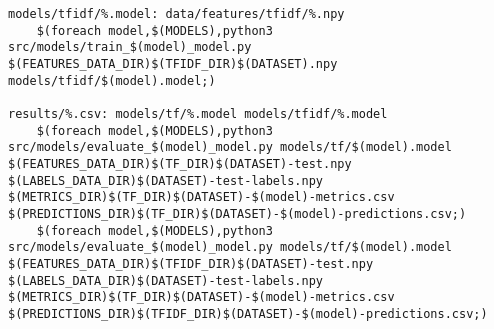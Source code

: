 \begin{lstlisting}
models/tfidf/%.model: data/features/tfidf/%.npy
	$(foreach model,$(MODELS),python3 src/models/train_$(model)_model.py $(FEATURES_DATA_DIR)$(TFIDF_DIR)$(DATASET).npy models/tfidf/$(model).model;)

results/%.csv: models/tf/%.model models/tfidf/%.model
	$(foreach model,$(MODELS),python3 src/models/evaluate_$(model)_model.py models/tf/$(model).model $(FEATURES_DATA_DIR)$(TF_DIR)$(DATASET)-test.npy $(LABELS_DATA_DIR)$(DATASET)-test-labels.npy $(METRICS_DIR)$(TF_DIR)$(DATASET)-$(model)-metrics.csv $(PREDICTIONS_DIR)$(TF_DIR)$(DATASET)-$(model)-predictions.csv;)
	$(foreach model,$(MODELS),python3 src/models/evaluate_$(model)_model.py models/tf/$(model).model $(FEATURES_DATA_DIR)$(TFIDF_DIR)$(DATASET)-test.npy $(LABELS_DATA_DIR)$(DATASET)-test-labels.npy $(METRICS_DIR)$(TF_DIR)$(DATASET)-$(model)-metrics.csv $(PREDICTIONS_DIR)$(TFIDF_DIR)$(DATASET)-$(model)-predictions.csv;)

\end{lstlisting}
